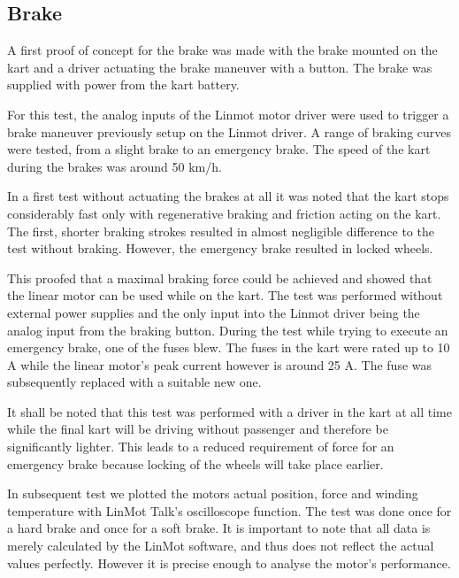 \subsection{Brake}
A first proof of concept for the brake was made with the brake mounted on the kart and a driver actuating the brake maneuver with a button.
The brake was supplied with power from the kart battery.


For this test, the analog inputs of the Linmot motor driver were used to trigger a brake maneuver previously setup on the Linmot driver. A range of braking curves were tested, from a slight brake to an emergency brake. The speed of the kart during the brakes was around 50 km/h.

In a first test without actuating the brakes at all it was noted that the kart stops considerably fast only with regenerative braking and friction acting on the kart.
The first, shorter braking strokes resulted in almost negligible difference to the test without braking.
However, the emergency brake resulted in locked wheels.

This proofed that a maximal braking force could be achieved and showed that the linear motor can be used while on the kart. The test was performed without external power supplies and the only input into the Linmot driver being the analog input from the braking button. During the test while trying to execute an emergency brake, one of the fuses blew. The fuses in the kart were rated up to 10 A while the linear motor's peak current however is around 25 A. The fuse was subsequently replaced with a suitable new one. 
 
It shall be noted that this test was performed with a driver in the kart at all time while the final kart will be driving without passenger and therefore be significantly lighter. This leads to a reduced requirement of force for an emergency brake because locking of the wheels will take place earlier.

In subsequent test we plotted the motors actual position, force and winding temperature with LinMot Talk's oscilloscope function. The test was done once for a hard brake and once for a soft brake. It is important to note that all data is merely calculated by the LinMot software, and thus does not reflect the actual values perfectly. However it is precise enough to analyse the motor's performance.



